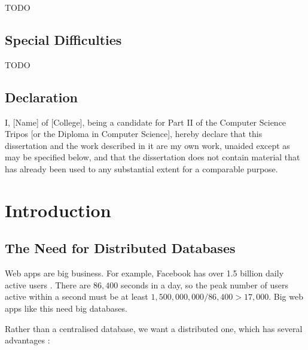 \documentclass[12pt,a4paper,twoside,openright]{report}
\begin{document}
TODO

\section*{Special Difficulties}

TODO
 
\newpage
\section*{Declaration}

I, [Name] of [College], being a candidate for Part II of the Computer
Science Tripos [or the Diploma in Computer Science], hereby declare
that this dissertation and the work described in it are my own work,
unaided except as may be specified below, and that the dissertation
does not contain material that has already been used to any substantial
extent for a comparable purpose.

\bigskip
{}

\medskip
{}

\tableofcontents

\listoffigures


\pagestyle{headings}

\chapter{Introduction}


\section{The Need for Distributed Databases}

Web apps are big business. For example, Facebook has over 1.5 billion daily active users \cite{facebook}. There are $86,400$ seconds in a day, so the peak number of users active within a second must be at least $1,500,000,000/86,400 > 17,000$.
Big web apps like this need big databases.


Rather than a centralised database, we want a distributed one, which has several advantages \cite{lake2013}:
\end{document}
